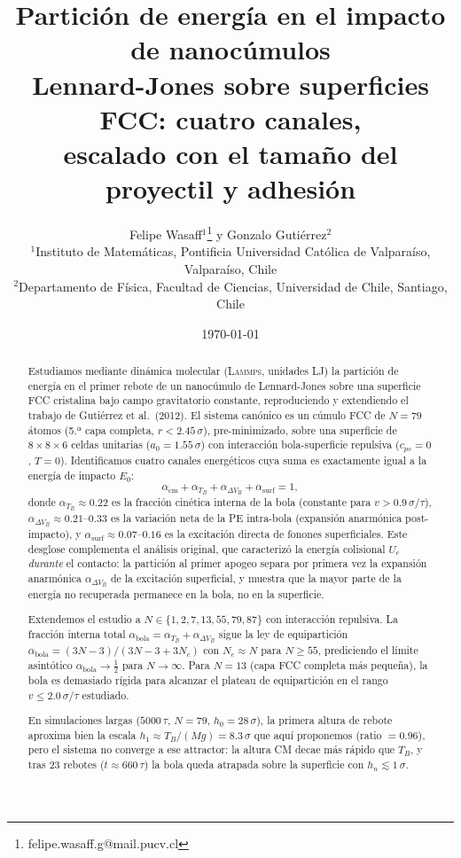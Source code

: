 \documentclass[12pt,a4paper]{article}
\title{%
    \textbf{Partición de energía en el impacto de nanocúmulos\\
    Lennard-Jones sobre superficies FCC: cuatro canales,\\
    escalado con el tamaño del proyectil y adhesión}
}
\author{%
    Felipe Wasaff$^{1}$\thanks{felipe.wasaff.g@mail.pucv.cl}
    \quad y \quad
    Gonzalo Gutiérrez$^{2}$\\[4pt]
    \small $^{1}$Instituto de Matemáticas, Pontificia Universidad Católica
    de Valparaíso, Valparaíso, Chile\\
    \small $^{2}$Departamento de Física, Facultad de Ciencias,
    Universidad de Chile, Santiago, Chile
}
\date{\today}
\newcommand{\lammps}{\textsc{Lammps}}
\begin{document}
\maketitle

\begin{abstract}

Estudiamos mediante dinámica molecular (\lammps, unidades LJ) la partición de
energía en el primer rebote de un nanocúmulo de Lennard-Jones sobre una
superficie FCC cristalina bajo campo gravitatorio constante, reproduciendo y
extendiendo el trabajo de Gutiérrez et al.\ (2012). El sistema canónico es un
cúmulo FCC de $N=79$ átomos (5.ª capa completa, $r < 2.45\,\sigma$),
pre-minimizado, sobre una superficie de $8\times8\times6$ celdas unitarias
($a_0=1.55\,\sigma$) con interacción bola-superficie repulsiva ($c_{ps}=0$,
$T=0$). Identificamos cuatro canales energéticos cuya suma es exactamente
igual a la energía de impacto $E_0$:
\[
    \alpha_{\mathrm{cm}} + \alpha_{T_B} + \alpha_{\Delta V_B}
    + \alpha_{\mathrm{surf}} = 1,
\]
donde $\alpha_{T_B}\approx0.22$ es la fracción cinética interna de la bola
(constante para $v>0.9\,\sigma/\tau$), $\alpha_{\Delta V_B}\approx0.21$--$0.33$
es la variación neta de la PE intra-bola (expansión anarmónica post-impacto),
y $\alpha_{\mathrm{surf}}\approx0.07$--$0.16$ es la excitación directa de
fonones superficiales. Este desglose complementa el análisis original, que
caracterizó la energía colisional $U_c$ \emph{durante} el contacto: la
partición al primer apogeo separa por primera vez la expansión anarmónica
$\alpha_{\Delta V_B}$ de la excitación superficial, y muestra que la mayor
parte de la energía no recuperada permanece en la bola, no en la superficie.

Extendemos el estudio a $N\in\{1,2,7,13,55,79,87\}$ con interacción repulsiva.
La fracción interna total $\alpha_{\mathrm{bola}}=\alpha_{T_B}+\alpha_{\Delta V_B}$
sigue la ley de equipartición $\alpha_{\mathrm{bola}}=(3N-3)/(3N-3+3N_c)$ con
$N_c\approx N$ para $N\geq55$, prediciendo el límite asintótico
$\alpha_{\mathrm{bola}}\to\tfrac{1}{2}$ para $N\to\infty$.
Para $N=13$ (capa FCC completa más pequeña), la bola es demasiado rígida para
alcanzar el plateau de equipartición en el rango $v\leq2.0\,\sigma/\tau$ estudiado.

En simulaciones largas ($5000\,\tau$, $N=79$, $h_0=28\,\sigma$), la primera
altura de rebote aproxima bien la escala $h_1\approx T_B/(Mg)=8.3\,\sigma$
que aquí proponemos (ratio $=0.96$), pero el sistema no converge a ese
attractor: la altura CM decae más rápido que $T_B$, y tras 23 rebotes
($t\approx660\,\tau$) la bola queda atrapada sobre la superficie con
$h_n\lesssim1\,\sigma$.


\end{abstract}
\end{document}
